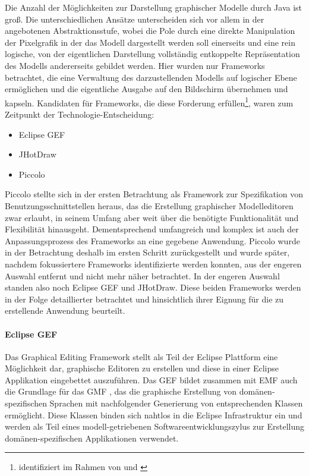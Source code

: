 Die Anzahl der Möglichkeiten zur Darstellung graphischer Modelle durch Java ist groß. Die unterschiedlichen Ansätze unterscheiden sich vor allem in der angebotenen Abstraktionsstufe, wobei die Pole durch eine direkte Manipulation der Pixelgrafik in der das Modell dargestellt werden soll einerseits und eine rein logische, von der eigentlichen Darstellung vollständig entkoppelte Repräsentation des Modells andererseits gebildet werden. Hier wurden nur Frameworks betrachtet, die eine Verwaltung des darzustellenden Modells auf logischer Ebene ermöglichen und die eigentliche Ausgabe auf den Bildschirm übernehmen und kapseln. Kandidaten für Frameworks, die diese Forderung erfüllen\footnote{identifiziert im Rahmen von \citep{Feiner08} und \citep{Seiringer08}}, waren zum Zeitpunkt der Technologie-Entscheidung:
\begin{itemize}
 \item Eclipse GEF \citep{Moore04}
 \item JHotDraw \citep{Gamma96}
 \item Piccolo \citep{Bederson04}
\end{itemize}

Piccolo stellte sich in der ersten Betrachtung als Framework zur Spezifikation von Benutzungsschnittstellen heraus, das die Erstellung graphischer Modelleditoren zwar erlaubt, in seinem Umfang aber weit über die benötigte Funktionalität und Flexibilität hinausgeht. Dementsprechend umfangreich und komplex ist auch der Anpassungsprozess des Frameworks an eine gegebene Anwendung. Piccolo wurde in der Betrachtung deshalb im ersten Schritt zurückgestellt und wurde später, nachdem fokussiertere Frameworks identifizierte werden konnten, aus der engeren Auswahl entfernt und nicht mehr näher betrachtet. In der engeren Auswahl standen also noch Eclipse GEF und JHotDraw. Diese beiden Frameworks werden in der Folge detaillierter betrachtet und hinsichtlich ihrer Eignung für die zu erstellende Anwendung beurteilt.

\paragraph{Eclipse GEF}
\label{par:gefgmf}

Das Graphical Editing Framework \citep{Moore04} stellt als Teil der Eclipse Plattform \citep{Holzner04} eine Möglichkeit dar, graphische Editoren zu erstellen und diese in einer Eclipse Applikation eingebettet auszuführen. Das \gls{GEF} bildet zusammen mit \gls{EMF} \citep{Budinsky03} auch die Grundlage für das \gls{GMF} \citep{Eclipse-Foundation09}, das die graphische Erstellung von domänen-spezifischen Sprachen mit nachfolgender Generierung von entsprechenden Klassen ermöglicht. Diese Klassen binden sich nahtlos in die Eclipse Infrastruktur ein und werden als Teil eines modell-getriebenen Softwareentwicklungszylus zur Erstellung domänen-spezifischen Applikationen verwendet.

